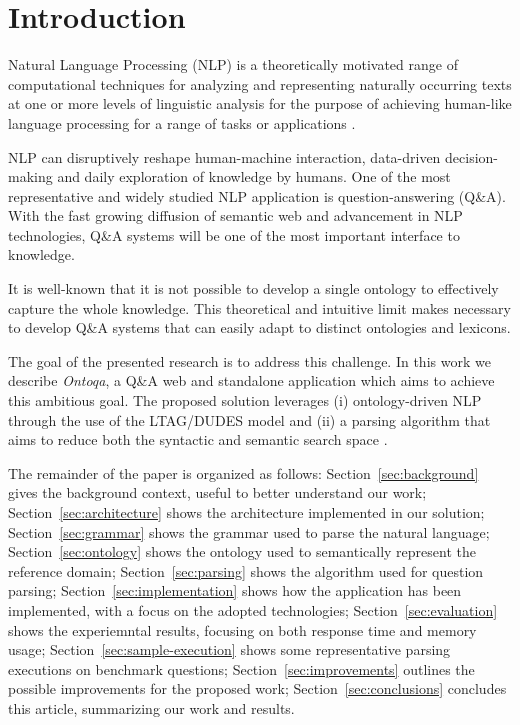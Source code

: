 \section{Introduction}
\label{sec:introduction}

Natural Language Processing (NLP) is a theoretically motivated range of
computational techniques for analyzing and representing naturally occurring texts
at one or more levels of linguistic analysis for the purpose of achieving human-like
language processing for a range of tasks or applications \cite{liddy2001natural}.

NLP can disruptively reshape human-machine interaction, data-driven decision-making and daily exploration of knowledge by humans.
%
One of the most representative and widely studied NLP application is question-answering (Q\&A).
%
With the fast growing diffusion of semantic web and advancement in NLP technologies, Q\&A systems will be one of the most important interface to knowledge.

It is well-known that it is not possible to develop a single ontology to effectively capture the whole knowledge.
%
This theoretical and intuitive limit makes necessary to develop Q\&A systems that can easily adapt to distinct ontologies and lexicons.

The goal of the presented research is to address this  challenge.
%
In this work we describe \textit{Ontoqa}, a Q\&A web and standalone application which aims to achieve this ambitious goal.
%
The proposed solution leverages (i) ontology-driven NLP through the use of the LTAG/DUDES model and (ii) a parsing algorithm that aims to reduce both the syntactic and  semantic search space \cite{cimiano2014ontology}.


The remainder of the paper is organized as follows:
Section~\ref{sec:background} gives the background context, useful to better understand our work;
Section~\ref{sec:architecture} shows the architecture implemented in our solution;
Section~\ref{sec:grammar} shows the grammar used to parse the natural language;
Section~\ref{sec:ontology} shows the ontology used to semantically represent the reference domain;
Section~\ref{sec:parsing} shows the algorithm used for question parsing;
Section~\ref{sec:implementation} shows how the application has been implemented, with a focus on the adopted technologies;
Section~\ref{sec:evaluation} shows the experiemntal results, focusing on both response time and memory usage;
Section~\ref{sec:sample-execution} shows some representative parsing executions on benchmark questions;
Section~\ref{sec:improvements} outlines the possible improvements for the proposed work;
Section~\ref{sec:conclusions} concludes this article, summarizing our work and results.